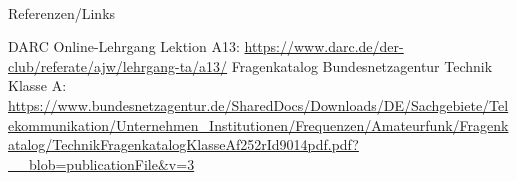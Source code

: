 \renewcommand{\refname}{Referenzen}

\hypertarget{refs}{}
\textcolor{white}{} \\ %
\Large Referenzen/Links
\footnotesize

\begin{thebibliography}{}
    DARC Online-Lehrgang Lektion A13:
    \url{https://www.darc.de/der-club/referate/ajw/lehrgang-ta/a13/}
     Fragenkatalog Bundesnetzagentur Technik Klasse A:\\
    \url{https://www.bundesnetzagentur.de/SharedDocs/Downloads/DE/Sachgebiete/Telekommunikation/Unternehmen_Institutionen/Frequenzen/Amateurfunk/Fragenkatalog/TechnikFragenkatalogKlasseAf252rId9014pdf.pdf?__blob=publicationFile&v=3}
\end{thebibliography}


